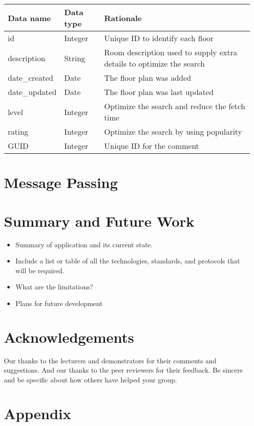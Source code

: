 \documentclass{sig-alt-release2}
\begin{document}
\begin{tabular}{| p{2cm} | p{2cm} | p{3cm}|}
\hline
Data name & Data type & Rationale \\
\hline
id & Integer & Unique ID to identify each floor \\
\hline
description & String & Room description used to supply extra details to optimize the search\\
\hline
date\_created & Date & The floor plan was added\\
\hline
date\_updated & Date & The floor plan was last updated\\
\hline
level & Integer & Optimize the search and reduce the fetch time\\
\hline
rating & Integer & Optimize the search by using popularity\\
\hline
GUID & Integer & Unique ID for the comment\\
\hline
\end{tabular}	


\section{Message Passing}




\section{Summary and Future Work}
\begin{itemize}
\item	Summary of application and its current state.
\item	Include a list or table of all the technologies, standards, and protocols that will be required.
\item	What are the limitations?
\item Plans for future development
\end{itemize}

\section{Acknowledgements}
Our thanks to the lecturers and demonstrators for their comments and suggestions. And our thanks to the peer reviewers for their feedback.
Be sincere and be specific about how others have helped your group.




\section{Appendix}

\end{document}
